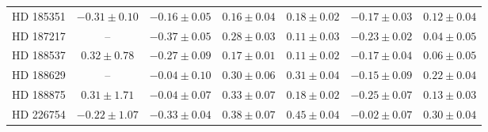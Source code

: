 \begin{table*}
\begin{tabular}{ccccccc}
HD 185351 & $-0.31 \pm 0.10$ & $-0.16 \pm 0.05$ & $0.16 \pm 0.04$ & $0.18 \pm 0.02$ & $-0.17 \pm 0.03$ & $0.12 \pm 0.04$ \\
HD 187217 & -- & $-0.37 \pm 0.05$ & $0.28 \pm 0.03$ & $0.11 \pm 0.03$ & $-0.23 \pm 0.02$ & $0.04 \pm 0.05$ \\
HD 188537 & $0.32 \pm 0.78$ & $-0.27 \pm 0.09$ & $0.17 \pm 0.01$ & $0.11 \pm 0.02$ & $-0.17 \pm 0.04$ & $0.06 \pm 0.05$ \\
HD 188629 & -- & $-0.04 \pm 0.10$ & $0.30 \pm 0.06$ & $0.31 \pm 0.04$ & $-0.15 \pm 0.09$ & $0.22 \pm 0.04$ \\
HD 188875 & $0.31 \pm 1.71$ & $-0.04 \pm 0.07$ & $0.33 \pm 0.07$ & $0.18 \pm 0.02$ & $-0.25 \pm 0.07$ & $0.13 \pm 0.03$ \\
HD 226754 & $-0.22 \pm 1.07$ & $-0.33 \pm 0.04$ & $0.38 \pm 0.07$ & $0.45 \pm 0.04$ & $-0.02 \pm 0.07$ & $0.30 \pm 0.04$ \\
\hline
\end{tabular}
\end{table*}
